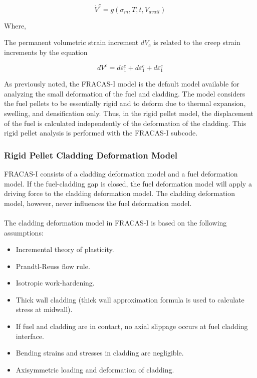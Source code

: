 \begin{equation}
    \label{eq:rate_perm_volume_strain_applied_loads}
    \dot{V}^{c} = g\left( \sigma_{m}, T, t, V_{avail} \right)
\end{equation}

Where,

The permanent volumetric strain increment $dV_{c}$ is related to the creep strain increments by the
equation

\begin{equation}
    \label{eq:delta_rate_perm_volume_strain_applied_loads}
    dV^{c} = d\varepsilon_{1}^{c} +  d\varepsilon_{1}^{c}  + d\varepsilon_{1}^{c}  
\end{equation}                 

As previously noted, the FRACAS-I model is the default model available for analyzing the small
deformation of the fuel and cladding. The model considers the fuel pellets to be essentially rigid
and to deform due to thermal expansion, swelling, and densification only. Thus, in the rigid pellet
model, the displacement of the fuel is calculated independently of the deformation of the cladding.
This rigid pellet analysis is performed with the FRACAS-I subcode.

\subsubsection{Rigid Pellet Cladding Deformation Model}\label{section:rigid-pellet-cladding-deformation-model}

FRACAS-I consists of a cladding deformation model and a fuel deformation
model. If the fuel-cladding gap is closed, the fuel deformation model
will apply a driving force to the cladding deformation model. The
cladding deformation model, however, never influences the fuel
deformation model.
\\
\\
The cladding deformation model in FRACAS-I is based on the following
assumptions:

\begin{itemize}
    \item Incremental theory of plasticity.
    \item Prandtl-Reuss flow rule.
    \item Isotropic work-hardening.
    \item Thick wall cladding (thick wall approximation formula is used to calculate stress at midwall).
    \item If fuel and cladding are in contact, no axial slippage occurs at fuel cladding interface.
    \item Bending strains and stresses in cladding are negligible.
    \item Axisymmetric loading and deformation of cladding.
\end{itemize}

